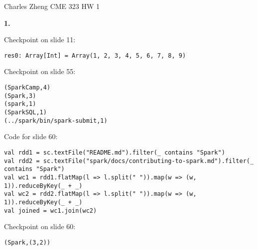 \documentclass[11pt]{article}
\begin{document}
\newcommand{\tr}{\text{tr}}
\newcommand{\E}{\textbf{E}}
\newcommand{\diag}{\text{diag}}
\newcommand{\argmax}{\text{argmax}}
\newcommand{\Cov}{\text{Cov}}
\newcommand{\Var}{\text{Var}}

Charles Zheng CME 323 HW 1

\textbf{1.}

Checkpoint on slide 11:
\begin{verbatim}
res0: Array[Int] = Array(1, 2, 3, 4, 5, 6, 7, 8, 9)
\end{verbatim}

Checkpoint on slide 55:
\begin{verbatim}
(SparkCamp,4)
(Spark,3)
(spark,1)
(SparkSQL,1)
(../spark/bin/spark-submit,1)
\end{verbatim}

Code for slide 60:
\begin{verbatim}
val rdd1 = sc.textFile("README.md").filter(_ contains "Spark")
val rdd2 = sc.textFile("spark/docs/contributing-to-spark.md").filter(_ contains "Spark")
val wc1 = rdd1.flatMap(l => l.split(" ")).map(w => (w, 1)).reduceByKey(_ + _)
val wc2 = rdd2.flatMap(l => l.split(" ")).map(w => (w, 1)).reduceByKey(_ + _)
val joined = wc1.join(wc2)
\end{verbatim}

Checkpoint on slide 60:
\begin{verbatim}
(Spark,(3,2))
\end{verbatim}
\end{document}
